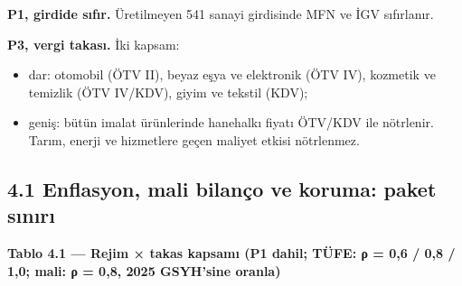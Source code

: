 \textbf{P1, girdide sıfır.} Üretilmeyen 541 sanayi girdisinde MFN ve İGV sıfırlanır.

\textbf{P3, vergi takası.} İki kapsam:

\begin{itemize}
\tightlist
\item
  dar: otomobil (ÖTV II), beyaz eşya ve elektronik (ÖTV IV), kozmetik ve temizlik (ÖTV IV/KDV), giyim ve tekstil (KDV);
\item
  geniş: bütün imalat ürünlerinde hanehalkı fiyatı ÖTV/KDV ile nötrlenir. Tarım, enerji ve hizmetlere geçen maliyet etkisi nötrlenmez.
\end{itemize}

\hypertarget{02a_politika_uzayi-41-enflasyon-mali-bilanuxe7o-ve-koruma-paket-sux131nux131rux131}{%
\subsection{4.1 Enflasyon, mali bilanço ve koruma: paket sınırı}\label{02a_politika_uzayi-41-enflasyon-mali-bilanuxe7o-ve-koruma-paket-sux131nux131rux131}}


\textbf{Tablo 4.1 --- Rejim × takas kapsamı (P1 dahil; TÜFE: ρ = 0,6 / 0,8 / 1,0; mali: ρ = 0,8, 2025 GSYH'sine oranla)}

\nopagebreak[4]

\begingroup\gbtablo\footnotesize

